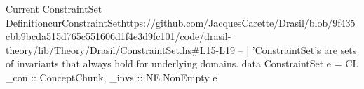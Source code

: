 \begin{haskell}{Current ConstraintSet Definition}{curConstraintSet}{https://github.com/JacquesCarette/Drasil/blob/9f435cbb9bcda515d765c551606d1f4e3d9fc101/code/drasil-theory/lib/Theory/Drasil/ConstraintSet.hs\#L15-L19}
-- | 'ConstraintSet's are sets of invariants that always hold for underlying domains.
data ConstraintSet e = CL {
    _con  :: ConceptChunk,
    _invs :: NE.NonEmpty e
}
\end{haskell}
